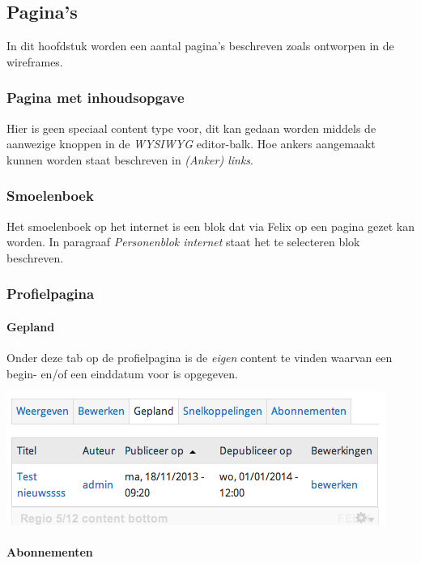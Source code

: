\subsection{Pagina's}\label{paginas}
In dit hoofdstuk worden een aantal pagina's beschreven zoals ontworpen in de wireframes.

\subsubsection{Pagina met inhoudsopgave}\label{paginainhoudsopgave}
Hier is geen speciaal content type voor, dit kan gedaan worden middels de aanwezige knoppen in de \emph{WYSIWYG} editor-balk. Hoe ankers aangemaakt kunnen worden staat beschreven in \emph{(Anker) links}.

\subsubsection{Smoelenboek}\label{smoelenboek}
Het smoelenboek op het internet is een blok dat via Felix op een pagina gezet kan worden. In paragraaf \emph{Personenblok internet} staat het te selecteren blok beschreven.

\subsubsection{Profielpagina}\label{profielpagina}

\paragraph{Gepland}

Onder deze tab op de profielpagina is de \emph{eigen} content te vinden waarvan een begin- en/of een einddatum voor is opgegeven.

\begin{center}
	\includegraphics[scale=0.75]{img/schedulerprofile.png}
\end{center}

\paragraph{Abonnementen}

